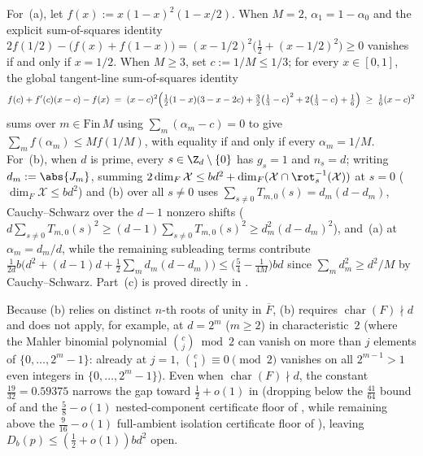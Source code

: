 \begin{outline}
For~(a), let $f(x) := x(1-x)^2(1 - x/2)$. When $M = 2$, $\alpha_1 = 1 - \alpha_0$ and the explicit
sum-of-squares identity
$2 f(1/2) - \bigl(f(x) + f(1 - x)\bigr) = (x - 1/2)^2\bigl(\frac{1}{2} + (x - 1/2)^2\bigr) \ge 0$
vanishes if and only if $x = 1/2$. When $M \ge 3$, set $c := 1/M \le 1/3$; for every $x \in [0, 1]$,
the global tangent-line sum-of-squares identity
\[
  f(c) + f'(c)(x - c) - f(x)
  \;=\;
  (x - c)^2\Bigl(\tfrac{1}{2}(1 - x)(3 - x - 2c)
    + \tfrac{3}{2}\bigl(\tfrac{1}{3} - c\bigr)^2
    + 2\bigl(\tfrac{1}{3} - c\bigr)
    + \tfrac{1}{6}\Bigr)
  \;\ge\;
  \tfrac{1}{6}(x - c)^2
\]
sums over $m \in \mathrm{Fin}\,M$ using $\sum_m (\alpha_m - c) = 0$ to give
$\sum_m f(\alpha_m) \le M f(1/M)$, with equality if and only if every $\alpha_m = 1/M$. For~(b), when
$d$ is prime, every $s \in \Z_d \setminus \{0\}$ has $g_s = 1$ and $n_s = d$; writing
$d_m := \abs{J_m}$, summing $2\dim_F\mathcal{X} \le b d^2 + \dim_F(\mathcal{X} \cap \rot_s^{-1}(\mathcal{X}))$
at $s = 0$ ($\dim_F\mathcal{X} \le bd^2$) and (b) over all $s \ne 0$ uses
$\sum_{s \ne 0} T_{m,0}(s) = d_m(d - d_m)$, Cauchy--Schwarz over the $d - 1$ nonzero shifts
($d\sum_{s \ne 0} T_{m,0}(s)^2 \ge (d - 1)\sum_{s \ne 0} T_{m,0}(s)^2 \ge d_m^2(d - d_m)^2$), and~(a) at $\alpha_m = d_m / d$, while the
remaining subleading terms contribute $\frac{1}{2d} b\bigl(d^2 + (d - 1)d + \frac{1}{2}\sum_m d_m(d - d_m)\bigr) \le
\bigl(\frac{5}{4} - \frac{1}{4M}\bigr)bd$ since $\sum_m d_m^2 \ge d^2 / M$ by Cauchy--Schwarz.
Part~(c) is proved directly in .
\end{outline}

\begin{remark}\label{rem:char-dividing-d}
Because (b) relies on distinct $n$-th roots of unity in $\overline{F}$,
(b) requires $\operatorname{char}(F) \nmid d$ and does not apply, for example,
at $d = 2^m$ ($m \ge 2$) in characteristic~$2$ (where the Mahler binomial polynomial $\binom{c}{j}
\bmod 2$ can vanish on more than $j$ elements of $\{0, \dots, 2^m - 1\}$: already at $j = 1$,
$\binom{c}{1} \equiv 0 \pmod 2$ vanishes on all $2^{m-1} > 1$ even integers in $\{0, \dots, 2^m - 1\}$).
Even when $\operatorname{char}(F) \nmid d$, the constant $\frac{19}{32} = 0.59375$ narrows the gap
toward $\frac{1}{2} + o(1)$ in \cite[Problem~9.1(a)]{SeventeenthPaper2026} (dropping below the
$\frac{41}{64}$ bound of \cite[Theorem~3.4]{SharedDecoders2026} and the $\frac{5}{8} - o(1)$
nested-component certificate floor of \cite[Theorem~C.6]{SharedDecoders2026}, while remaining above
the $\frac{9}{16} - o(1)$ full-ambient isolation certificate floor of
\cite[Theorem~C.7]{SharedDecoders2026}), leaving $D_b(p) \le (\frac{1}{2} + o(1))b d^2$ open.
\end{remark}
